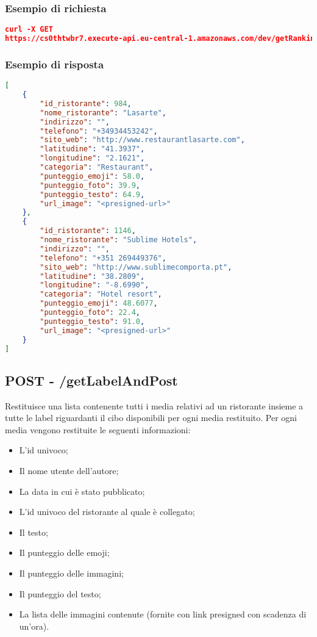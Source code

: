 \subsubsection{Esempio di richiesta}
\begin{lstlisting}[language=json, caption={Esempio di richiesta \texttt{/getRanking}}, captionpos=b]
curl -X GET 
https://cs0thtwbr7.execute-api.eu-central-1.amazonaws.com/dev/getRanking?from=5&size=2

\end{lstlisting}

\subsubsection{Esempio di risposta}
\begin{lstlisting}[language=json, caption={Esempio di risposta \texttt{/getRanking}}, captionpos=b]
[
    {
        "id_ristorante": 984,
        "nome_ristorante": "Lasarte",
        "indirizzo": "",
        "telefono": "+34934453242",
        "sito_web": "http://www.restaurantlasarte.com",
        "latitudine": "41.3937",
        "longitudine": "2.1621",
        "categoria": "Restaurant",
        "punteggio_emoji": 58.0,
        "punteggio_foto": 39.9,
        "punteggio_testo": 64.9,
        "url_image": "<presigned-url>"
    },
    {
        "id_ristorante": 1146,
        "nome_ristorante": "Sublime Hotels",
        "indirizzo": "",
        "telefono": "+351 269449376",
        "sito_web": "http://www.sublimecomporta.pt",
        "latitudine": "38.2809",
        "longitudine": "-8.6990",
        "categoria": "Hotel resort",
        "punteggio_emoji": 48.6077,
        "punteggio_foto": 22.4,
        "punteggio_testo": 91.0,
        "url_image": "<presigned-url>"
    }
]
\end{lstlisting}

\pagebreak


\subsection{POST - /getLabelAndPost} 
Restituisce una lista contenente tutti i media relativi ad un ristorante insieme a tutte le label riguardanti il cibo disponibili per ogni media restituito. Per ogni media vengono restituite le seguenti informazioni:
\begin{itemize}
	\item L'id univoco;
    \item Il nome utente dell'autore;
    \item La data in cui è stato pubblicato;
    \item L'id univoco del ristorante al quale è collegato;
    \item Il testo;
    \item Il punteggio delle emoji;
    \item Il punteggio delle immagini;
    \item Il punteggio del testo;
	\item La lista delle immagini contenute (fornite con link presigned con scadenza di un'ora).
\end{itemize}

